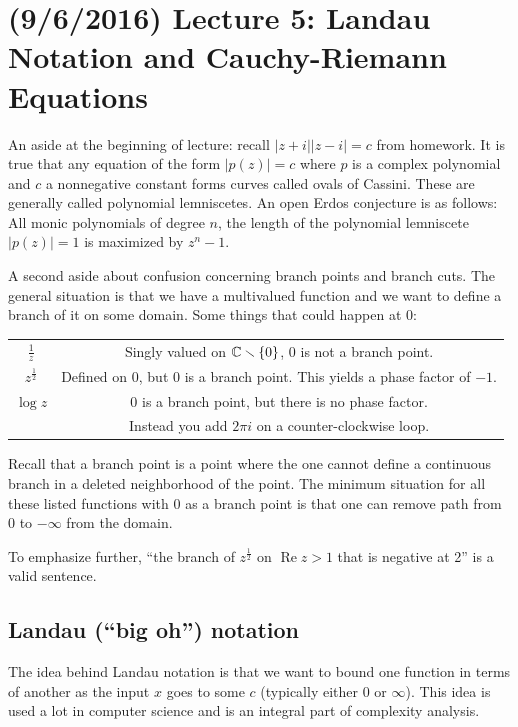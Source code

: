 \documentclass[11pt,leqno,oneside]{amsart}
\numberwithin{thm}{section}
\renewcommand{\Re}{\operatorname{Re}}
\begin{document}
\section{(9/6/2016) Lecture 5: Landau Notation and Cauchy-Riemann Equations}
\begin{rmk*}
    An aside at the beginning of lecture: recall $|z+i||z-i|=c$ from homework.
    It is true that any equation of the form $|p(z)| = c$ where $p$ is a
    complex polynomial and $c$ a nonnegative constant forms curves called ovals
    of Cassini. These are generally called polynomial lemniscetes. An open
    Erdos conjecture is as follows: \\

    All monic polynomials of degree $n$, the length of the polynomial
    lemniscete $|p(z)|=1$ is maximized by $z^n-1$.
\end{rmk*}

    A second aside about confusion concerning branch points and branch cuts.
    The general situation is that we have a multivalued function and we want to
    define a branch of it on some domain. Some things that could happen at 0:
    \\
    \begin{tabular}{|c|c|}
        \hline
        $\frac{1}{z}$ & Singly valued on ${\mathbb C} \smallsetminus \{0\}$, 0 is not a
        branch point. \\
        $z^{\frac{1}{2}}$ & Defined on 0, but 0 is a branch point. This yields
        a phase factor of $-1$. \\
        $\log z$ & 0 is a branch point, but there is no phase factor. \\ \ & Instead
        you add $2\pi i$ on a counter-clockwise loop. \\
        \hline
    \end{tabular}
    Recall that a branch point is a point where the one cannot define a
    continuous branch in a deleted neighborhood of the point. The minimum
    situation for all these listed functions with 0 as a branch point is that
    one can remove path from 0 to $-\infty$ from the domain.

    To emphasize further, ``the branch of $z^\frac{1}{2}$ on $\Re z > 1$ that
    is negative at 2'' is a valid sentence.

    \subsection*{Landau (``big oh'') notation}
    The idea behind Landau notation is that we want to bound one function in
    terms of another as the input $x$ goes to some $c$ (typically either 0 or
    $\infty$). This idea is used a lot in computer science and is an integral
    part of complexity analysis.
\end{document}
